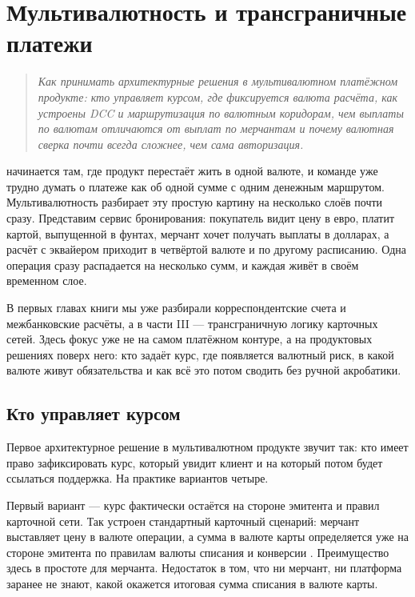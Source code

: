 
\chapter{Мультивалютность и трансграничные платежи}
\label{ch:multicurrency}
\begin{quote}
  \itshape
  Как принимать архитектурные решения в мультивалютном
  платёжном продукте: кто управляет курсом, где фиксируется
  валюта расчёта, как устроены DCC и маршрутизация по валютным
  коридорам, чем выплаты по валютам отличаются от выплат
  по мерчантам и почему валютная сверка почти всегда сложнее,
  чем сама авторизация.
\end{quote}

 начинается там, где продукт перестаёт жить в одной валюте, и команде уже трудно думать о платеже
как об одной сумме с одним денежным маршрутом. Мультивалютность
разбирает эту простую картину на несколько слоёв почти сразу.
Представим сервис
бронирования: покупатель видит цену в евро, платит картой,
выпущенной в фунтах, мерчант хочет получать выплаты в долларах,
а расчёт с эквайером приходит в четвёртой валюте и по другому
расписанию. Одна операция сразу распадается на несколько сумм,
и каждая живёт в своём временном слое.

В первых главах книги мы уже разбирали корреспондентские счета
и межбанковские расчёты, а в части III --- трансграничную логику
карточных сетей. Здесь фокус уже не на самом платёжном контуре,
а на продуктовых решениях поверх него: кто задаёт курс, где
появляется валютный риск, в какой валюте живут обязательства
и как всё это потом сводить без ручной акробатики.

\section{Кто управляет курсом}
\label{sec:mc-currencies}

Первое архитектурное решение в мультивалютном продукте звучит
так: кто имеет право зафиксировать курс, который увидит клиент
и на который потом будет ссылаться поддержка. На практике
вариантов четыре.

Первый вариант --- курс фактически остаётся на стороне
эмитента и правил карточной сети. Так устроен стандартный
карточный сценарий: мерчант выставляет цену в валюте операции,
а сумма в валюте карты определяется уже на стороне эмитента
по правилам валюты списания и конверсии
\cite{visa-core-rules,mc-dcc-guide}.
Преимущество здесь в простоте для мерчанта. Недостаток в том,
что ни мерчант, ни платформа заранее не знают, какой окажется
итоговая сумма списания в валюте карты.

